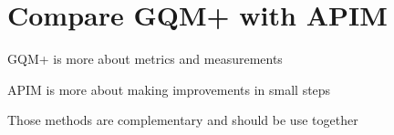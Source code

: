 \section{Compare GQM+ with APIM}

GQM+ is more about metrics and measurements

APIM is more about making improvements in small steps

Those methods are complementary and should be use together